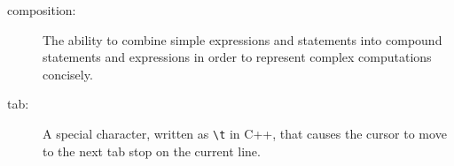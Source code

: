 \begin{description}
\item[composition:] The ability to combine simple
expressions and statements into compound statements and expressions
in order to represent complex computations concisely.

\item[tab:] A special character, written as \verb+\t+ in C++,
that causes the cursor to move to the next tab stop on the
current line.


\end{description}


